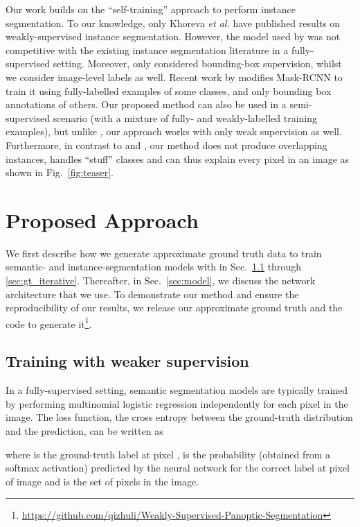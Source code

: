 \documentclass[runningheads]{llncs}
\def\etal{\emph{et al.} }
\begin{document}
Our work builds on the ``self-training'' approach to perform instance segmentation.
To our knowledge, only Khoreva \etal \cite{khoreva_cvpr_2017} have published results on weakly-supervised instance segmentation.
However, the model used by \cite{khoreva_cvpr_2017} was not competitive with the existing instance segmentation literature in a fully-supervised setting.
Moreover, \cite{khoreva_cvpr_2017} only considered bounding-box supervision, whilst we consider image-level labels as well.
Recent work by \cite{hu_arxiv_2017} modifies Mask-RCNN \cite{he_iccv_2017} to train it using fully-labelled examples of some classes, and only bounding box annotations of others.
Our proposed method can also be used in a semi-supervised scenario (with a mixture of fully- and weakly-labelled training examples), but unlike \cite{hu_arxiv_2017}, our approach works with only weak supervision as well.
Furthermore, in contrast to \cite{khoreva_cvpr_2017} and \cite{hu_arxiv_2017}, our method does not produce overlapping instances, handles ``stuff'' classes and can thus explain every pixel in an image as shown in Fig.~\ref{fig:teaser}.
 \section{Proposed Approach}

We first describe how we generate approximate ground truth data to train semantic- and instance-segmentation models with in Sec.~\ref{sec:gt_intro} through \ref{sec:gt_iterative}.
Thereafter, in Sec.~\ref{sec:model}, we discuss the network architecture that we use.
To demonstrate our method and ensure the reproducibility of our results, we release our approximate ground truth and the code to generate it\footnote{\scriptsize{\url{ https://github.com/qizhuli/Weakly-Supervised-Panoptic-Segmentation}}}.

\subsection{Training with weaker supervision}
\label{sec:gt_intro}
In a fully-supervised setting, semantic segmentation models are typically trained by performing multinomial logistic regression independently for each pixel in the image.
The loss function, the cross entropy between the ground-truth distribution and the prediction, can be written as 

where  is the ground-truth label at pixel ,  is the probability (obtained from a softmax activation) predicted by the neural network for the correct label at pixel  of image  and  is the set of pixels in the image.
\end{document}
